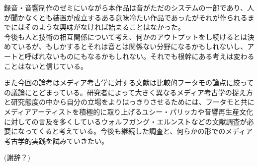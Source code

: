 \documentclass[a4paper,report]{jsbook}
\begin{document}
録音・音響制作のゼミにいながら本作品は音がただのシステムの一部であり、人が聞かなくとも装置が成立するある意味冷たい作品であったがそれが作られるまでにはそのような興味がなければ始まることはなかった。\\
今後も人と技術の相互関係について考え、何かのアウトプットをし続けるとは決めているが、もしかするとそれは音とは関係ない分野になるかもしれないし、アートと呼ばれないものにもなるかもしれない。それでも根幹にある考えは変わることはないと信じている。

また今回の論考はメディア考古学に対する文献は比較的フータモの論点に絞っての議論にとどまっている。研究者によって大きく異なるメディア考古学の捉え方と研究態度の中から自分の立場をよりはっきりさせるためには、フータモと共にメディアアーティストを積極的に取り上げるユシー・パリッカや音響再生産文化に対しての言及を多くしているウォルフガング・エルンストなどの文献調査が必要になってくると考えている。今後も継続した調査と、何らかの形でのメディア考古学的実践を試みていきたい。

(謝辞？)


\printbibliography[title = 参考文献]
\end{document}

